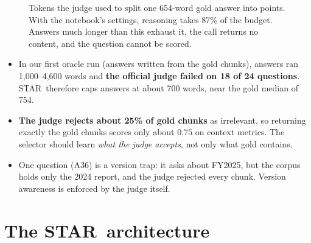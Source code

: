 \documentclass[10pt,a4paper]{article}
\newcommand{\STAR}{\textsc{STAR}}
\begin{document}
\begin{figure}[h]
\centering
{}
\caption{Tokens the judge used to split one 654-word gold answer into points. With the notebook's settings, reasoning takes 87\% of the budget. Answers much longer than this exhaust it, the call returns no content, and the question cannot be scored.}
\label{fig:judge}
\end{figure}

\begin{itemize}
\item In our first oracle run (answers written from the gold chunks), answers ran 1{,}000--4{,}600 words and \textbf{the official judge failed on 18 of 24 questions}. \STAR\ therefore caps answers at about 700 words, near the gold median of 754.
\item \textbf{The judge rejects about 25\% of gold chunks} as irrelevant, so returning exactly the gold chunks scores only about $0.75$ on context metrics. The selector should learn \emph{what the judge accepts}, not only what gold contains.
\item One question (A36) is a version trap: it asks about FY2025, but the corpus holds only the 2024 report, and the judge rejected every chunk. Version awareness is enforced by the judge itself.
\end{itemize}

\section{The \STAR\ architecture}
\end{document}

